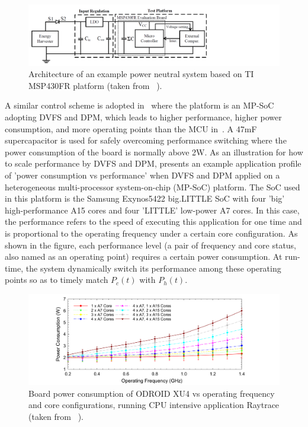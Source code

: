 \begin{figure}
    \centering
    \includegraphics[width=\columnwidth]{ch2_review/figures/graceful_schematic}
    \caption{Architecture of an example power neutral system based on TI MSP430FR platform (taken from \cite{balsamo2016graceful}~).}
    \label{Figure:graceful_schematic}
\end{figure}

A similar control scheme is adopted in~\cite{fletcher2017power} where the platform is an MP-SoC adopting DVFS and DPM, which leads to higher performance, higher power consumption, and more operating points than the MCU in~\cite{balsamo2016graceful}. A 47mF supercapacitor is used for safely overcoming performance switching where the power consumption of the board is normally above 2W. As an illustration for how to scale performance by DVFS and DPM,  presents an example application profile of 'power consumption vs performance' when DVFS and DPM applied on a heterogeneous multi-processor system-on-chip (MP-SoC) platform. The SoC used in this platform is the Samsung Exynos5422 big.LITTLE SoC with four 'big' high-performance A15 cores and four 'LITTLE' low-power A7 cores. In this case, the performance refers to the speed of executing this application for one time and is proportional to the operating frequency under a certain core configuration. As shown in the figure, each performance level (a pair of frequency and core status, also named as an operating point) requires a certain power consumption. At run-time, the system dynamically switch its performance among these operating points so as to timely match $P_c(t)$ with $P_h(t)$.

\begin{figure}
    \centering
    \includegraphics[width=\columnwidth]{ch2_review/figures/dvfs}
    \caption{Board power consumption of ODROID XU4 vs operating frequency and core configurations, running CPU intensive application Raytrace (taken from \cite{fletcher2017power}~).}
    \label{Figure:dvfs}
\end{figure}

